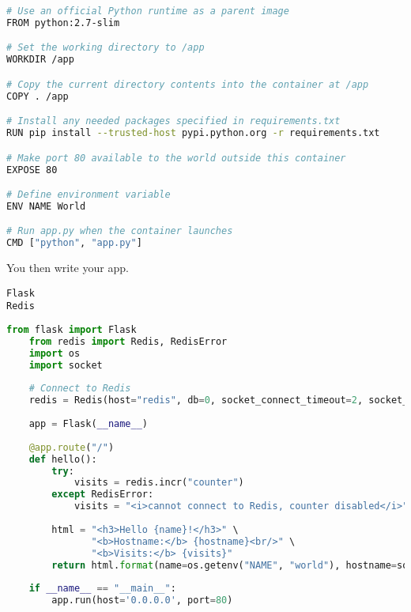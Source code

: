 \begin{lstlisting}[language=bash]
# Use an official Python runtime as a parent image
FROM python:2.7-slim

# Set the working directory to /app
WORKDIR /app

# Copy the current directory contents into the container at /app
COPY . /app

# Install any needed packages specified in requirements.txt
RUN pip install --trusted-host pypi.python.org -r requirements.txt

# Make port 80 available to the world outside this container
EXPOSE 80

# Define environment variable
ENV NAME World

# Run app.py when the container launches
CMD ["python", "app.py"]
\end{lstlisting}

You then write your app. 
\begin{lstlisting}[caption=requirements.txt]
Flask
Redis
\end{lstlisting}

\begin{lstlisting}[language=python, caption=main.py]
    from flask import Flask
    from redis import Redis, RedisError
    import os
    import socket
    
    # Connect to Redis
    redis = Redis(host="redis", db=0, socket_connect_timeout=2, socket_timeout=2)
    
    app = Flask(__name__)
    
    @app.route("/")
    def hello():
        try:
            visits = redis.incr("counter")
        except RedisError:
            visits = "<i>cannot connect to Redis, counter disabled</i>"
    
        html = "<h3>Hello {name}!</h3>" \
               "<b>Hostname:</b> {hostname}<br/>" \
               "<b>Visits:</b> {visits}"
        return html.format(name=os.getenv("NAME", "world"), hostname=socket.gethostname(), visits=visits)
    
    if __name__ == "__main__":
        app.run(host='0.0.0.0', port=80)
\end{lstlisting}

